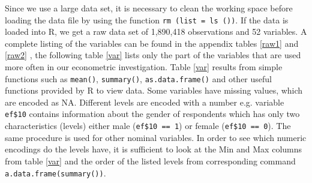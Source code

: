 Since we use a large data set, it is necessary to clean the working space before loading the data file by using the function \texttt{rm (list = ls ())}. If the data is loaded into R, we get a raw data set of 1,890,418 observations and 52 variables. A complete listing of the variables can be found in the appendix tables \ref{raw1} and \ref{raw2} , the following table \ref{var} lists only the part of the variables that are used more often in our econometric investigation. Table \ref{var} results from simple functions such as \texttt{mean()}, \texttt{summary()}, \texttt{as.data.frame()} and other useful functions provided by R to view data. Some variables have missing values, which are encoded as NA. Different levels are encoded with a number e.g. variable \texttt{ef\$10} contains information about the gender of respondents which has only two characteristics (levels) either male (\texttt{ef\$10 == 1}) or female (\texttt{ef\$10 == 0}). The same procedure is used for other nominal variables. In order to see which numeric encodings do the levels have, it is sufficient to look at the Min and Max columns from table \ref{var} and the order of the listed levels from corresponding command \texttt{a.data.frame(summary())}.

